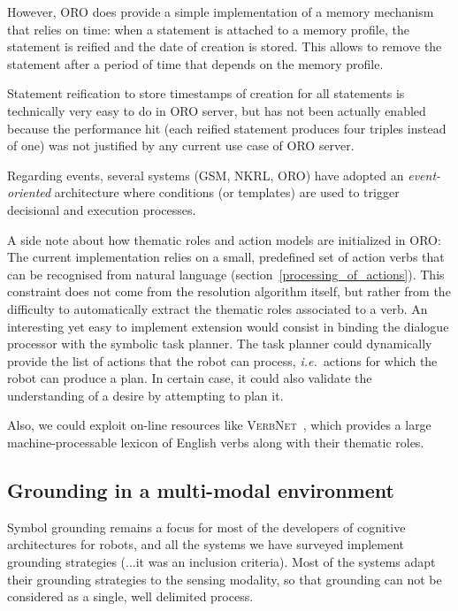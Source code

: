 \documentclass{IEEEtran}
\newcommand{\ie}{{\textit{i.e.\ }}}
\begin{document}
However, ORO does provide a simple implementation of a memory mechanism that
relies on time: when a statement is attached to a memory profile, the statement
is reified and the date of creation is stored. This allows to remove the
statement after a period of time that depends on the memory profile.

Statement reification to store timestamps of creation for all statements is
technically very easy to do in ORO server, but has not been actually enabled
because the performance hit (each reified statement produces four triples
instead of one) was not justified by any current use case of ORO server.

Regarding events, several systems (GSM, NKRL, ORO) have adopted an {\em
event-oriented} architecture where conditions (or templates) are used to
trigger decisional and execution processes.

A side note about how thematic roles and action models are initialized in ORO:
The current implementation relies on a small, predefined set of action verbs
that can be recognised from natural language
(section~\ref{processing_of_actions}).  This constraint does not come from the
resolution algorithm itself, but rather from the difficulty to automatically
extract the thematic roles associated to a verb. An interesting yet easy to
implement extension would consist in binding the dialogue processor with the
symbolic task planner. The task planner could dynamically provide the list of
actions that the robot can process, \ie actions for which the robot can produce
a plan. In certain case, it could also validate the understanding of a desire
by attempting to plan it.

Also, we could exploit on-line resources like
\textsc{VerbNet}~\cite{Kipper2008}, which provides a large machine-processable
lexicon of English verbs along with their thematic roles.


\subsection{Grounding in a multi-modal environment}

Symbol grounding remains a focus for most of the developers of cognitive
architectures for robots, and all the systems we have surveyed implement
grounding strategies (...it was an inclusion criteria). Most of the systems
adapt their grounding strategies to the sensing modality, so that grounding can
not be considered as a single, well delimited process.
\end{document}
